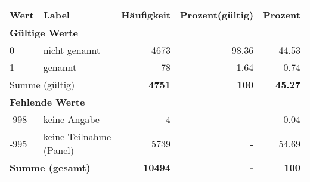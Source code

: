      \begin{longtable}{lXrrr}
     \toprule
     \textbf{Wert} & \textbf{Label} & \textbf{Häufigkeit} & \textbf{Prozent(gültig)} & \textbf{Prozent} \\
     \endhead
     \midrule
     \multicolumn{5}{l}{\textbf{Gültige Werte}}\\

     0 &
     \multicolumn{1}{X}{ nicht genannt   } &


       \num{4673} &
       \num[round-mode=places,round-precision=2]{98.36} &
         \num[round-mode=places,round-precision=2]{44.53} \\

     1 &
     \multicolumn{1}{X}{ genannt   } &


       \num{78} &
       \num[round-mode=places,round-precision=2]{1.64} &
         \num[round-mode=places,round-precision=2]{0.74} \\
     \midrule
     \multicolumn{2}{l}{Summe (gültig)} &
       \textbf{\num{4751}} &
     \textbf{\num{100}} &
       \textbf{\num[round-mode=places,round-precision=2]{45.27}} \\
     \multicolumn{5}{l}{\textbf{Fehlende Werte}}\\
       -998 &
       keine Angabe &
         \num{4} &
        - &
         \num[round-mode=places,round-precision=2]{0.04} \\
       -995 &
       keine Teilnahme (Panel) &
         \num{5739} &
        - &
         \num[round-mode=places,round-precision=2]{54.69} \\
     \midrule
     \multicolumn{2}{l}{\textbf{Summe (gesamt)}} &
          \textbf{\num{10494}} &
        \textbf{-} &
        \textbf{\num{100}} \\
     \bottomrule
     \end{longtable}
     
